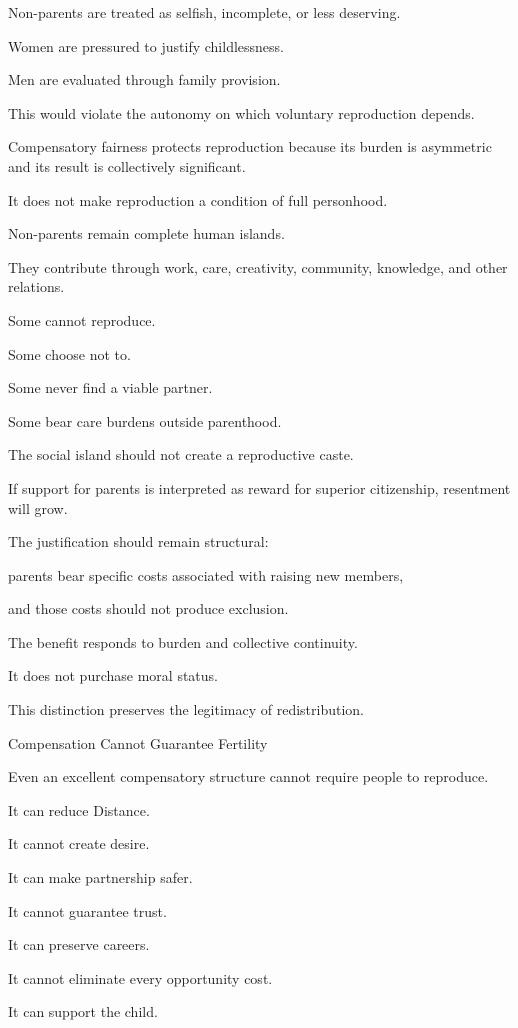 Non-parents are treated as selfish, incomplete, or less deserving.

Women are pressured to justify childlessness.

Men are evaluated through family provision.

This would violate the autonomy on which voluntary reproduction depends.

Compensatory fairness protects reproduction because its burden is asymmetric and its result is collectively significant.

It does not make reproduction a condition of full personhood.

Non-parents remain complete human islands.

They contribute through work, care, creativity, community, knowledge, and other relations.

Some cannot reproduce.

Some choose not to.

Some never find a viable partner.

Some bear care burdens outside parenthood.

The social island should not create a reproductive caste.

If support for parents is interpreted as reward for superior citizenship, resentment will grow.

The justification should remain structural:

parents bear specific costs associated with raising new members,

and those costs should not produce exclusion.

The benefit responds to burden and collective continuity.

It does not purchase moral status.

This distinction preserves the legitimacy of redistribution.

Compensation Cannot Guarantee Fertility

Even an excellent compensatory structure cannot require people to reproduce.

It can reduce Distance.

It cannot create desire.

It can make partnership safer.

It cannot guarantee trust.

It can preserve careers.

It cannot eliminate every opportunity cost.

It can support the child.

